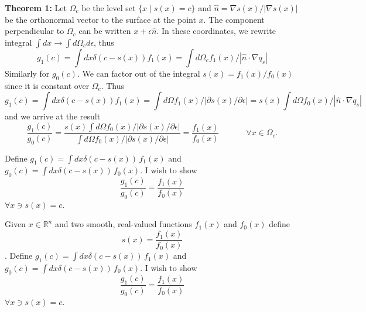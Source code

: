 \documentclass[11pt, oneside]{article}   	%
\begin{document}
\textbf{Theorem 1:}
Let $\Omega_{c}$ be the level set $\{x \mid s(x) = c \}$ and $\hat{n}=\nabla s(x) / |\nabla s(x)|$ be the orthonormal vector to the surface at the point $x$. The component perpendicular to $\Omega_c$ can be written $x+\epsilon \hat{n}$. In these coordinates, we rewrite integral $\int dx \to \int d\Omega_c d\epsilon$, thus
\begin{equation}
g_1(c) = \int dx \delta(c-s(x)) f_1(x) = \int d\Omega_c f_1(x)  / | \hat{n} \cdot \nabla q_s  |
\end{equation}
Similarly for $g_0(c)$. We can factor out of the integral $s(x)=f_1(x)/f_0(x)$ since it is constant over $\Omega_c$.
Thus
\begin{equation}
g_1(c) = \int dx \delta(c-s(x)) f_1(x) = \int d\Omega f_1(x) / |\partial s(x)/\partial \epsilon| = s(x) \int d\Omega f_0(x)  / | \hat{n} \cdot \nabla q_s  |
\end{equation}
and we arrive at the result
\begin{equation}
\frac{g_1(c)}{g_0(c)} = \frac{s(x) \int d\Omega f_0(x) / |\partial s(x)/\partial \epsilon|}{ \int d\Omega f_0(x) / |\partial s(x)/\partial \epsilon|} = \frac{f_1(x)}{f_0(x)} \;\hspace{3em} \forall x\in\Omega_c.
\end{equation}





Define $g_1(c) = \int dx \delta(c - s(x) ) \, f_1(x)$ and $g_0(c) = \int dx \delta(c - s(x) ) \, f_0(x)$.
I wish to show
\begin{equation}
\frac{g_1(c)}{g_0(c)} = \frac{f_1(x)}{f_0(x)}
\end{equation}
$\forall x \ni s(x)=c$.


Given $x\in \mathbb{R}^n$ and two smooth, real-valued functions $f_1(x)$ and $f_0(x)$ define 
\begin{equation} 
s(x)=\frac{f_1(x)}{f_0(x)}
\end{equation}.
Define $g_1(c) = \int dx \delta(c - s(x) ) \, f_1(x)$ and $g_0(c) = \int dx \delta(c - s(x) ) \, f_0(x)$.
I wish to show
\begin{equation}
\frac{g_1(c)}{g_0(c)} = \frac{f_1(x)}{f_0(x)}
\end{equation}
$\forall x \ni s(x)=c$.
\end{document}
